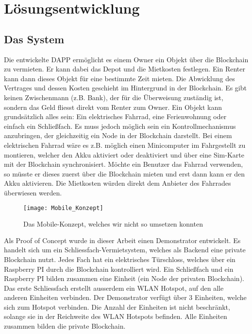 \chapter{Lösungsentwicklung}
\label{cha:Lösungsentwicklung}

\section{Das System}
\label{cha:Das System}

Die entwickelte DAPP ermöglicht es einem Owner ein Objekt über die Blockchain zu vermieten. Er kann dabei das Depot und die Mietkosten festlegen. Ein Renter kann dann dieses Objekt für eine bestimmte Zeit mieten. Die Abwicklung des Vertrages und dessen Kosten geschieht im Hintergrund in der Blockchain. Es gibt keinen Zwischenmann (z.B. Bank), der für die Überweisung zuständig ist, sondern das Geld fliesst direkt vom Renter zum Owner. 
Ein Objekt kann grundsätzlich alles sein: Ein elektrisches Fahrrad, eine Ferienwohnung oder einfach ein Schließfach. Es muss jedoch möglich sein ein Kontrollmechanismus anzubringen, der gleichzeitig ein Node in der Blockchain darstellt. Bei einem elektrischen Fahrrad wäre es z.B. möglich einen Minicomputer im Fahrgestellt zu montieren, welcher den Akku aktiviert oder deaktiviert und über eine Sim-Karte mit der Blockchain synchronisiert. Möchte ein Benutzer das Fahrrad verwenden, so müsste er dieses zuerst über die Blockchain mieten und erst dann kann er den Akku aktivieren. Die Mietkosten würden direkt dem Anbieter des Fahrrades überwiesen werden.

\begin{figure}
\centering
\texttt{[image: Mobile\_Konzept]}
\caption{Das Mobile-Konzept, welches wir nicht so umsetzen konnten}
\label{fig:Mobile_Konzept}
\end{figure}

\vspace{1em}
Als Proof of Concept wurde in dieser Arbeit einen Demonstrator entwickelt. Es handelt sich um ein Schliessfach-Vermietsystem, welches als Backend eine private Blockchain nutzt. Jedes Fach hat ein elektrisches Türschloss, welches über ein Raspberry PI durch die Blockchain kontrolliert wird. Ein Schließfach und ein Raspberry PI bilden zusammen eine Einheit (ein Node der privaten Blockchain). Das erste Schliessfach erstellt ausserdem ein WLAN Hotspot, auf den alle anderen Einheiten verbinden. Der Demonstrator verfügt über 3 Einheiten, welche sich zum Hotspot verbinden. Die Anzahl der Einheiten ist nicht beschränkt, solange sie in der Reichweite des WLAN Hotspots befinden. Alle Einheiten zusammen bilden die private Blockchain. 

